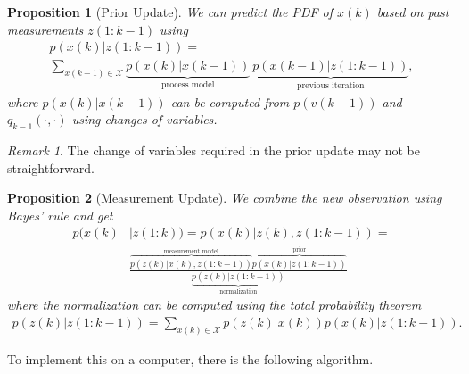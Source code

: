 \documentclass[]{hsrzf}
\theoremstyle{plain}
\newtheorem{prop}{Proposition}[section]
\theoremstyle{definition}
\theoremstyle{remark}
\newtheorem*{remark}{Remark}
\begin{document}
\begin{prop}[Prior Update]
  We can predict the PDF of $x(k)$ based on past measurements $z(1:k-1)$ using
  \begin{gather*}
    p(x(k)|z(1:k-1)) = \\
      \sum_{x(k-1) \in \mathcal{X}}
      \underbrace{p(x(k) | x(k-1))}_{\text{process model}} ~
      \underbrace{p(x(k-1) | z(1:k-1))}_{\text{previous iteration}},
  \end{gather*}
  where $p(x(k) | x(k-1))$ can be computed from $p(v(k-1))$ and
  $q_{k-1}(\cdot, \cdot)$ using changes of variables.
\end{prop}

\begin{remark}
  The change of variables required in the prior update may not be
  straightforward.
\end{remark}

\begin{prop}[Measurement Update]
  \label{pro:measurement-update}
  We combine the new observation using Bayes' rule and get
  \begin{align*}
    p(x(k) &| z(1:k)) = p(x(k) | z(k), z(1:k-1)) = \\
      &\frac{
        \overbrace{p(z(k) | x(k), z(1:k-1))}^{\text{measurement model}}
        \overbrace{p(x(k) | z(1:k-1))}^{\text{prior}}
      }{\underbrace{p(z(k) | z(1:k-1))}_\text{normalization}}
  \end{align*}
  where the normalization can be computed using the total probability theorem
  \begin{align*}
    p(z(k) | z(1:k-1)) =
      \sum_{x(k) \in \mathcal{X}} p(z(k) | x(k)) p(x(k) | z(1: k-1)).
  \end{align*}
\end{prop}

To implement this on a computer, there is the following algorithm.
\end{document}

